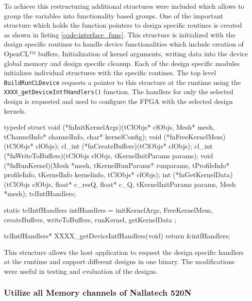 
To achieve this restructuring additional structures were included which allows to
group the variables into functionality based groups. One of the important structure
which holds the function pointers to design specific routines is created
as shown in listing \ref{code:interface_func}. This structure is initialized
with the design specific routines to handle device functionalities which
include creation of OpenCL™ buffers, Initialization of kernel arguments,
writing data into the device global memory and design specific cleanup.
Each of the design specific modules initializes individual structures
with the specific routines. The top level \texttt{BuildRunCLDevice} requests
a pointer to this structure at the runtime using the \texttt{XXXX\_getDeviceIntfHandlers()}
function. The handlers for only the selected design is requested and used to configure the
FPGA with the selected design kernels.
\begin{CppCode}[caption=Structure to hold the design specific interface function pointers
    and initialization example, frame=tlrb, label=code:interface_func]
typedef struct
{
    void (*fnInitKernelArgs)(tClObjs* clObjs, Mesh* mesh, tChannelInfo* channelInfo,
                             char* kernelConfig);
    void (*fnFreeKernelMem)(tClObjs* clObjs);
    cl_int (*fnCreateBuffers)(tClObjs* clObjs);
    cl_int (*fnWriteToBuffers)(tClObjs clObjs, tKernelInitParams params);
    void (*fnRunKernel)(Mesh *mesh, tKernelRunParams* runparams, tProfileInfo* profileInfo,
                        tKernelInfo kernelinfo, tClObjs* clObjs);
    int (*fnGetKernelData)(tClObjs clObjs, float* c_resQ, float* c_Q,
                           tKernelInitParams params, Mesh *mesh);
} tclIntfHandlers;

static tclIntfHandlers intfHandlers =
{
    initKernelArgs,
    FreeKernelMem,
    createBuffers,
    writeToBuffers,
    runKernel,
    getKernelData
};

tclIntfHandlers* XXXX_getDeviceIntfHandlers(void)
{
    return &intfHandlers;
}
\end{CppCode}

This structure allows the host application to request the design specific handlers at the
runtime and support different designs in one binary. The modifications were useful in testing
and evaluation of the designs.

\subsubsection*{Utilize all Memory channels of Nallatech 520N}

